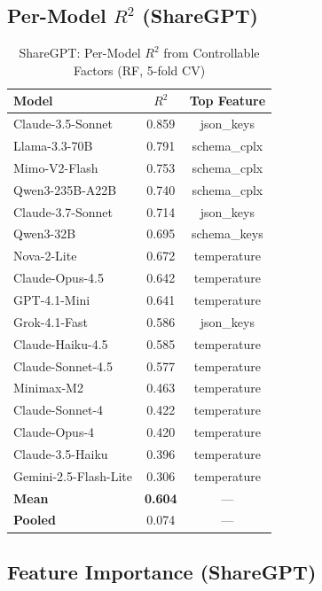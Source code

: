 \documentclass[sigconf,anonymous,review]{acmart}
\begin{document}
\subsection{Per-Model $R^2$ (ShareGPT)}

\begin{table}[h]
\centering
\caption{ShareGPT: Per-Model $R^2$ from Controllable Factors (RF, 5-fold CV)}
\label{tab:sharegpt_permodel_r2}
\small
\begin{tabular}{@{}lcc@{}}
\toprule
\textbf{Model} & \textbf{$R^2$} & \textbf{Top Feature} \\
\midrule
Claude-3.5-Sonnet & 0.859 & json\_keys \\
Llama-3.3-70B & 0.791 & schema\_cplx \\
Mimo-V2-Flash & 0.753 & schema\_cplx \\
Qwen3-235B-A22B & 0.740 & schema\_cplx \\
Claude-3.7-Sonnet & 0.714 & json\_keys \\
Qwen3-32B & 0.695 & schema\_keys \\
Nova-2-Lite & 0.672 & temperature \\
Claude-Opus-4.5 & 0.642 & temperature \\
GPT-4.1-Mini & 0.641 & temperature \\
Grok-4.1-Fast & 0.586 & json\_keys \\
Claude-Haiku-4.5 & 0.585 & temperature \\
Claude-Sonnet-4.5 & 0.577 & temperature \\
Minimax-M2 & 0.463 & temperature \\
Claude-Sonnet-4 & 0.422 & temperature \\
Claude-Opus-4 & 0.420 & temperature \\
Claude-3.5-Haiku & 0.396 & temperature \\
Gemini-2.5-Flash-Lite & 0.306 & temperature \\
\midrule
\textbf{Mean} & \textbf{0.604} & --- \\
\textbf{Pooled} & 0.074 & --- \\
\bottomrule
\end{tabular}
\end{table}

\subsection{Feature Importance (ShareGPT)}
\end{document}

